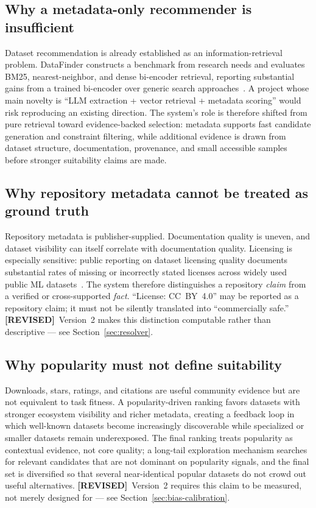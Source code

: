 \documentclass[11pt]{article}
\newcommand{\revtag}{\textcolor{accent}{\textbf{[REVISED]}}\ }
\begin{document}
\subsection{Why a metadata-only recommender is insufficient}
Dataset recommendation is already established as an information-retrieval problem. DataFinder constructs
a benchmark from research needs and evaluates BM25, nearest-neighbor, and dense bi-encoder retrieval,
reporting substantial gains from a trained bi-encoder over generic search approaches~\cite{datafinder}.
A project whose main novelty is ``LLM extraction + vector retrieval + metadata scoring'' would risk
reproducing an existing direction. The system's role is therefore shifted from pure retrieval toward
evidence-backed selection: metadata supports fast candidate generation and constraint filtering, while
additional evidence is drawn from dataset structure, documentation, provenance, and small accessible
samples before stronger suitability claims are made.

\subsection{Why repository metadata cannot be treated as ground truth}
Repository metadata is publisher-supplied. Documentation quality is uneven, and dataset visibility can
itself correlate with documentation quality. Licensing is especially sensitive: public reporting on
dataset licensing quality documents substantial rates of missing or incorrectly stated licenses across
widely used public ML datasets~\cite{licensing-audit}. The system therefore distinguishes a repository
\emph{claim} from a verified or cross-supported \emph{fact}. ``License: CC~BY~4.0'' may be reported as a
repository claim; it must not be silently translated into ``commercially safe.'' \revtag Version~2 makes
this distinction computable rather than descriptive --- see Section~\ref{sec:resolver}.

\subsection{Why popularity must not define suitability}
Downloads, stars, ratings, and citations are useful community evidence but are not equivalent to task
fitness. A popularity-driven ranking favors datasets with stronger ecosystem visibility and richer
metadata, creating a feedback loop in which well-known datasets become increasingly discoverable while
specialized or smaller datasets remain underexposed. The final ranking treats popularity as contextual
evidence, not core quality; a long-tail exploration mechanism searches for relevant candidates that are
not dominant on popularity signals, and the final set is diversified so that several near-identical
popular datasets do not crowd out useful alternatives. \revtag Version~2 requires this claim to be
measured, not merely designed for --- see Section~\ref{sec:bias-calibration}.
\end{document}

